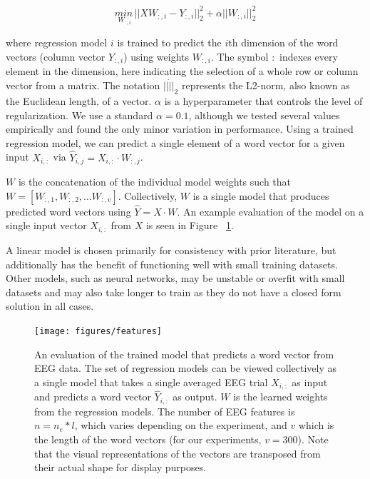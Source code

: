 \begin{equation}
  \underset{W_{:,i}}{min\,} {|| X W_{:, i} - Y_{:, i}||_2^2 + 
  \alpha ||W_{:, i}||_2^2}
  \label{eq:ridge}
\end{equation}

\noindent where regression model $i$ is trained to predict the $i$th dimension 
of the word vectors (column vector $Y_{:,i}$) using weights $W_{:,i}$. The 
symbol $:$ indexes every element in the dimension, here indicating the 
selection of a whole row or column vector from a matrix. The notation 
$||\dot||_2$ represents the L2-norm, also known as the Euclidean length, of a 
vector. $\alpha$ is a hyperparameter that controls the level of regularization.  
We use a standard $\alpha = 0.1$, although we tested several values empirically 
and found the only minor variation in performance. Using a trained regression 
model, we can predict a single element of a word vector for a given input 
$X_{i,:}$ via $\hat{Y}_{i,j} = X_{i, :} \cdot W_{:,j}$.
  
$W$ is the concatenation of the individual model weights such that $W = [ 
W_{:,1}, W_{:,2}, ... W_{:,v} ]$. Collectively, $W$ is a single model that 
produces predicted word vectors using $\hat{Y} = X \cdot W$. An example 
evaluation of the model on a single input vector $X_{i,:}$ from $X$ is seen in 
Figure ~\ref{fig:features}.

A linear model is chosen primarily for consistency with prior literature, but 
additionally has the benefit of functioning well with small training datasets.
Other models, such as neural networks, may be unstable or overfit with small 
datasets and may also take longer to train as they do not have a closed form 
solution in all cases.

\begin{figure}[t]
  \centering
  \texttt{[image: figures/features]}
  \caption[Evaluation of the Trained Model]{
    An evaluation of the trained model that predicts a word vector from EEG 
    data.  The set of regression models can be viewed collectively as a single 
    model that takes a single averaged EEG trial $X_{i,:}$ as input and 
    predicts a word vector $\hat{Y}_{i,:}$ as output. $W$ is the learned 
    weights from the regression models. The number of EEG features is $n = n_e 
    * l$, which varies depending on the experiment, and $v$ which is the length 
    of the word vectors (for our experiments, $v=300$). Note that the visual 
    representations of the vectors are transposed from their actual shape for 
    display purposes.
  }
  \label{fig:features}
\end{figure}

